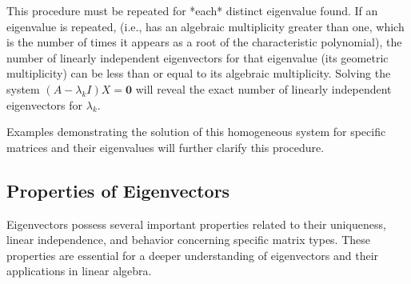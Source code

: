 \documentclass{article}
\begin{document}
This procedure must be repeated for *each* distinct eigenvalue found. If an eigenvalue is repeated, (i.e., has an algebraic multiplicity greater than one, which is the number of times it appears as a root of the characteristic polynomial), the number of linearly independent eigenvectors for that eigenvalue (its geometric multiplicity) can be less than or equal to its algebraic multiplicity. Solving the system $(A - \lambda_k I) X = \mathbf{0}$ will reveal the exact number of linearly independent eigenvectors for $\lambda_k$.

Examples demonstrating the solution of this homogeneous system for specific matrices and their eigenvalues will further clarify this procedure.


\subsection{Properties of Eigenvectors}

Eigenvectors possess several important properties related to their uniqueness, linear independence, and behavior concerning specific matrix types. These properties are essential for a deeper understanding of eigenvectors and their applications in linear algebra.
\end{document}
